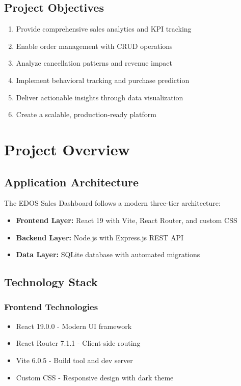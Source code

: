 \documentclass[12pt,a4paper]{article}
\begin{document}
\subsection{Project Objectives}

\begin{enumerate}[leftmargin=*]
    \item Provide comprehensive sales analytics and KPI tracking
    \item Enable order management with CRUD operations
    \item Analyze cancellation patterns and revenue impact
    \item Implement behavioral tracking and purchase prediction
    \item Deliver actionable insights through data visualization
    \item Create a scalable, production-ready platform
\end{enumerate}

\newpage

\section{Project Overview}

\subsection{Application Architecture}

The EDOS Sales Dashboard follows a modern three-tier architecture:

\begin{itemize}[leftmargin=*]
    \item \textbf{Frontend Layer:} React 19 with Vite, React Router, and custom CSS
    \item \textbf{Backend Layer:} Node.js with Express.js REST API
    \item \textbf{Data Layer:} SQLite database with automated migrations
\end{itemize}

\subsection{Technology Stack}

\subsubsection{Frontend Technologies}
\begin{itemize}[leftmargin=*]
    \item React 19.0.0 - Modern UI framework
    \item React Router 7.1.1 - Client-side routing
    \item Vite 6.0.5 - Build tool and dev server
    \item Custom CSS - Responsive design with dark theme
\end{itemize}
\end{document}
